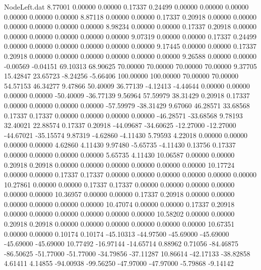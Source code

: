 \begin{filecontents}{NodeLeft.dat}
   8.77001    0.00000    0.00000     0.17337    0.24499    0.00000    0.00000    0.00000    0.00000    0.00000    0.00000
   8.87118    0.00000    0.00000     0.17337    0.20918    0.00000    0.00000    0.00000    0.00000    0.00000    0.00000
   8.98234    0.00000    0.00000     0.17337    0.20918    0.00000    0.00000    0.00000    0.00000    0.00000    0.00000
   9.07319    0.00000    0.00000     0.17337    0.24499    0.00000    0.00000    0.00000    0.00000    0.00000    0.00000
   9.17445    0.00000    0.00000     0.17337    0.20918    0.00000    0.00000    0.00000    0.00000    0.00000    0.00000
   9.26588    0.00000    0.00000    -0.00569   -0.04151   69.10313   68.90625   70.00000   70.00000   70.00000   70.00000
   9.37705   15.42847   23.65723    -8.24256   -5.66406  100.00000  100.00000   70.00000   70.00000   54.57153   46.34277
   9.47866   50.40009   36.77139    -4.12413   -4.44644    0.00000    0.00000    0.00000    0.00000  -50.40009  -36.77139
   9.56964   57.59979   38.31429     0.20918    0.17337    0.00000    0.00000    0.00000    0.00000  -57.59979  -38.31429
   9.67060   46.28571   33.68568     0.17337    0.17337    0.00000    0.00000    0.00000    0.00000  -46.28571  -33.68568
   9.78193   32.40021   22.88574     0.17337    0.20918  -44.09687  -34.60625  -12.27000  -12.27000  -44.67021  -35.15574
   9.87319   -4.62860   -4.11430     5.79593    4.22018    0.00000    0.00000    0.00000    0.00000    4.62860    4.11430
   9.97480   -5.65735   -4.11430     0.13756    0.17337    0.00000    0.00000    0.00000    0.00000    5.65735    4.11430
  10.06587    0.00000    0.00000     0.20918    0.20918    0.00000    0.00000    0.00000    0.00000    0.00000    0.00000
  10.17724    0.00000    0.00000     0.17337    0.17337    0.00000    0.00000    0.00000    0.00000    0.00000    0.00000
  10.27861    0.00000    0.00000     0.17337    0.17337    0.00000    0.00000    0.00000    0.00000    0.00000    0.00000
  10.36957    0.00000    0.00000     0.17337    0.20918    0.00000    0.00000    0.00000    0.00000    0.00000    0.00000
  10.47074    0.00000    0.00000     0.17337    0.20918    0.00000    0.00000    0.00000    0.00000    0.00000    0.00000
  10.58202    0.00000    0.00000     0.20918    0.20918    0.00000    0.00000    0.00000    0.00000    0.00000    0.00000
  10.67351    0.00000    0.00000     0.10174    0.10174  -45.10313  -44.97500  -45.69000  -45.69000  -45.69000  -45.69000
  10.77492  -16.97144  -14.65714     0.88962    0.71056  -84.46875  -86.50625  -51.77000  -51.77000  -34.79856  -37.11287
  10.86614  -42.17133  -38.82858     4.61411    4.14855  -94.00938  -99.56250  -47.97000  -47.97000   -5.79868   -9.14142

\end{filecontents}
